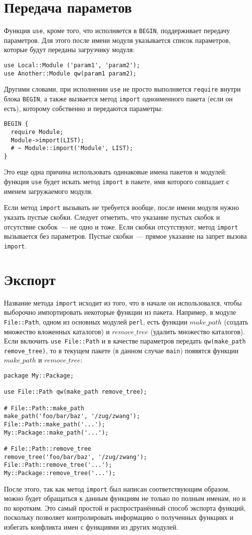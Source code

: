 \section{Передача параметов} %
Функция \verb|use|, кроме того, что исполняется в \verb|BEGIN|, поддерживает передачу параметров. Для этого после имени модуля указывается список параметров, которые будут переданы загрузчику модуля:
\begin{verbatim}
use Local::Module ('param1', 'param2');
use Another::Module qw(param1 param2);
\end{verbatim}
Другими словами, при исполнении \verb|use| не просто выполняется \verb|require| внутри блока \verb|BEGIN|, а также вызвается метод \verb|import| одноименного пакета (если он есть), которому собственно и передаются параметры:
\begin{verbatim}
BEGIN {
  require Module;
  Module->import(LIST);
  # ~ Module::import('Module', LIST);
}
\end{verbatim}
Это еще одна причина использовать одинаковые имена пакетов и модулей: функция \verb|use| будет искать метод \verb|import| в пакете, имя которого совпадает с именем загружаемого модуля.

Если метод \verb|import| вызывать не требуется вообще, после имени модуля нужно указать пустые скобки. Следует отметить, что указание пустых скобок и отсутствие скобок~--- не одно и тоже. Если скобки отсутствуют, метод \verb|import| вызывается без параметров. Пустые скобки~--- прямое указание на запрет вызова \verb|import|.

\section{Экспорт} %
Название метода \verb|import| исходит из того, что в начале он использовался, чтобы выборочно импортировать некоторые функции из пакета. Например, в модуле \verb|File::Path|, одном из основных модулей \verb|perl|, есть функции $make\_path$ (создать множество вложенных каталогов) и $remove\_tree$ (удалить множество каталогов). Если включить \verb|use File::Path| и в качестве параметров передать \verb|qw(make_path remove_tree)|, то в текущем пакете (в данном случае \verb|main|) появятся функции $make\_path$ и $remove\_tree$:
\begin{verbatim}
package My::Package;

use File::Path qw(make_path remove_tree);

# File::Path::make_path
make_path('foo/bar/baz', '/zug/zwang');
File::Path::make_path('...');
My::Package::make_path('...');

# File::Path::remove_tree
remove_tree('foo/bar/baz', '/zug/zwang');
File::Path::remove_tree('...');
My::Package::remove_tree('...');
\end{verbatim}
После этого, так как метод \verb|import| был написан соответствующим образом, можно будет обращаться к данным функциям не только по полным именам, но и по коротким. Это самый простой и распространённый способ экспорта функций, поскольку позволяет контролировать информацию о полученных функциях и избегать конфликта имен с функциями из других модулей.

